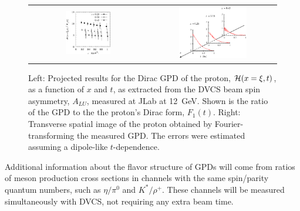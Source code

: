 \begin{figure}
\begin{tabular}{cc}
\parbox[c]{0.4\textwidth}{
\includegraphics[width=0.4\textwidth]{../der/gpdtdep.eps}}
&
\parbox[c]{0.56\textwidth}{
\includegraphics[width=0.56\textwidth]{../der/spatial_narrow.eps}}
\end{tabular}
\caption{\small{Left: Projected results for the Dirac GPD of the proton, 
${\cal H}(x = \xi, t)$, as a function of $x$ and $t$, as extracted from the 
DVCS beam spin asymmetry, $A_{LU}$, measured at JLab at 12~GeV. Shown is the 
ratio of the GPD to the the proton's Dirac form, $F_1(t)$.  Right: Transverse 
spatial image of the proton obtained by Fourier-transforming the measured GPD. 
The errors were estimated assuming a dipole-like $t$-dependence.}}
\label{fig:H_proj}
\end{figure}

Additional information about the flavor structure of GPDs will come from 
ratios of meson production cross sections in channels with the same 
spin/parity quantum numbers, such as $\eta / \pi^0$ and $K^* / \rho^+$. 
These channels will be measured simultaneously with DVCS, not requiring any 
extra beam time.

